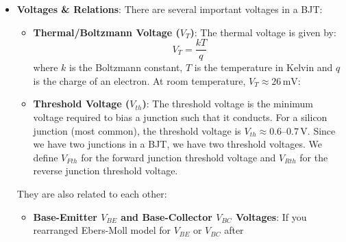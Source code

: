 \begin{itemize}
\begin{itemize}
        can be related to each other by defining,
        \[
          \alpha_F I_{FS} = \alpha_R I_{RS} = I_S
        \]
        We'll use \(I_S\) as the saturation current in the rest of this document.
      \item \textbf{Base Current (\(I_B\))}:
        The base current is related to the collector current by the current gain
        (\(\beta\)):
        \[
          I_B = \frac{I_C}{\beta}
        \]
        \(\beta\) is not constant and varies with temperature, collector current and
        collector-emitter voltage. Use Ebers-Moll model instead.
      \item \textbf{Emitter Current (\(I_E\))}:
        The emitter current is the sum of the collector and base currents:
        \begin{align*}
          I_E &= I_C + I_B \\
          I_E &= I_C + \frac{I_C}{\beta} \\
          I_E &= I_C \left( 1 + \frac{1}{\beta} \right)
        \end{align*}
    \end{itemize}
  \item \textbf{Voltages \& Relations}:
    There are several important voltages in a BJT:\
    \begin{itemize}
      \item \textbf{Thermal/Boltzmann Voltage (\(V_T\))}:
        The thermal voltage is given by:
        \[
          V_T = \frac{kT}{q}
        \]
        where \(k\) is the Boltzmann constant, \(T\) is the temperature in
        Kelvin and \(q\) is the charge of an electron. At room temperature,
        \(V_T \approx 26\,\mathrm{mV}\):
      \item \textbf{Threshold Voltage (\(V_{th}\))}:
        The threshold voltage is the minimum voltage required to bias a junction
        such that it conducts. For a silicon junction (most common), the
        threshold voltage is \(V_{th} \approx 0.6\text{--}0.7\,\mathrm{V}\).
        Since we have two junctions in a BJT, we have two threshold voltages.
        We define \(V_{Fth}\) for the forward junction threshold voltage and
        \(V_{Rth}\) for the reverse junction threshold voltage.
    \end{itemize}
    They are also related to each other:
    \begin{itemize}
      \item \textbf{Base-Emitter \(V_{BE}\) and Base-Collector \(V_{BC}\) Voltages}:
        If you rearranged Ebers-Moll model for \(V_{BE}\) or \(V_{BC}\) after

\end{itemize}
\end{itemize}
